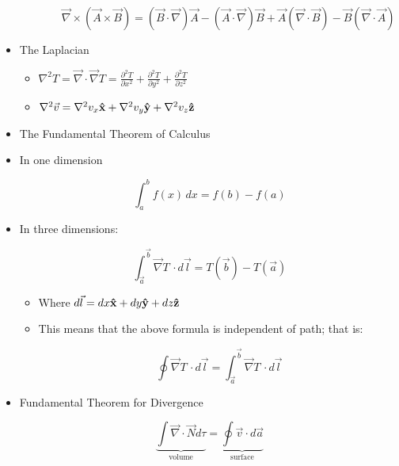 \begin{itemize}
\begin{itemize}
\begin{itemize}
            $$\vec{\nabla}\times(\vec{A}\times\vec{B})=(\vec{B}\cdot\vec{\nabla})\vec{A}-(\vec{A}\cdot\vec{\nabla})\vec{B}+\vec{A}(\vec{\nabla}\cdot\vec{B})-\vec{B}(\vec{\nabla}\cdot\vec{A})$$

        \end{itemize}

    \end{itemize}

  \item The Laplacian

    \begin{itemize}

      \item $\nabla^2 T=\vec{\nabla}\cdot \vec{\nabla}T=\displaystyle \frac{\partial^2T}{\partial x^2}+\frac{\partial^2T}{\partial y^2}+\frac{\partial^2T}{\partial z^2}$

      \item $\nabla^2 \vec{v}=\nabla^2v_x\bold{\hat{x}}+\nabla^2v_y\bold{\hat{y}}+\nabla^2v_z\bold{\hat{z}}$

    \end{itemize}

  \item The Fundamental Theorem of Calculus

  \item In one dimension

    $$\int_a^b f(x)\,dx=f(b)-f(a)$$

  \item In three dimensions:

    $$\int_{\vec{a}}^{\vec{b}}\vec{\nabla}T\,\cdot d\vec{l}=T(\vec{b})-T(\vec{a})$$

    \begin{itemize}

      \item Where $d\vec{l}=dx\bold{\hat{x}}+dy\bold{\hat{y}}+dz\bold{\hat{z}}$

      \item This means that the above formula is independent of path; that is:

        $$\oint\vec{\nabla}T\,\cdot d\vec{l}=\int_{\vec{a}}^{\vec{b}}\vec{\nabla} T\,\cdot d\vec{l}$$

    \end{itemize}

  \item Fundamental Theorem for Divergence

    $$\underbrace{\int\vec{\nabla}\cdot\vec{N}d\tau}_{\text{volume}}=\underbrace{\oint\vec{v}\cdot d\vec{a}}_{\text{surface}}$$


\end{itemize}
